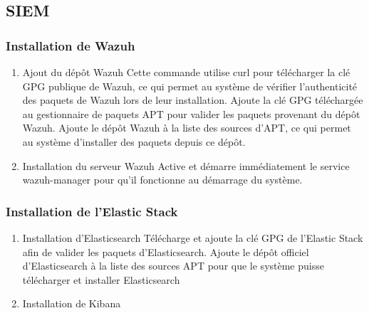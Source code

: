 \documentclass{article}
\begin{document}
\subsection{SIEM}

\subsubsection{Installation de Wazuh}
\begin{enumerate}
	\item Ajout du dépôt Wazuh
	Cette commande utilise curl pour télécharger la clé GPG publique de Wazuh, ce qui permet au système de vérifier l’authenticité des paquets de Wazuh lors de leur installation. 
	Ajoute la clé GPG téléchargée au gestionnaire de paquets APT pour valider les paquets provenant du dépôt Wazuh.
	Ajoute le dépôt Wazuh à la liste des sources d’APT, ce qui permet au système d’installer des paquets depuis ce dépôt.

	\item Installation du serveur Wazuh
	Active et démarre immédiatement le service wazuh-manager pour qu’il fonctionne au démarrage du système.
\end{enumerate}

\subsubsection{Installation de l'Elastic Stack}

\begin{enumerate}
	\item Installation d'Elasticsearch
	Télécharge et ajoute la clé GPG de l’Elastic Stack afin de valider les paquets d’Elasticsearch.
	Ajoute le dépôt officiel d’Elasticsearch à la liste des sources APT pour que le système puisse télécharger et installer Elasticsearch

	\item Installation de Kibana

\end{enumerate}
\end{document}
